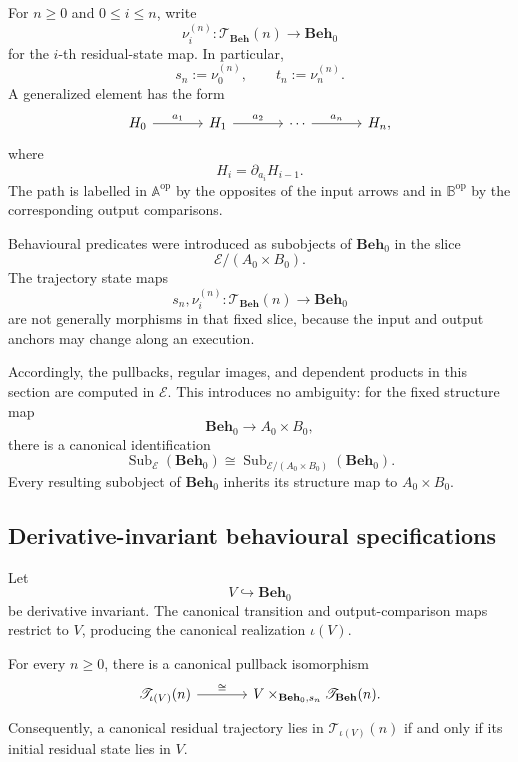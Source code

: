For \(n\geq0\) and \(0\leq i\leq n\), write
\[
    \nu_i^{(n)}:
    \mathscr T_{\mathbf{Beh}}(n)
    \to
    \mathbf{Beh}_0
\]
for the \(i\)-th residual-state map. In particular,
\[
    s_n:=\nu_0^{(n)},
    \qquad
    t_n:=\nu_n^{(n)}.
\]
A generalized element has the form
\[
\begin{tikzcd}[column sep=large]
    H_0
        \arrow[r, "a_1"]
    &
    H_1
        \arrow[r, "a_2"]
    &
    \cdots
        \arrow[r, "a_n"]
    &
    H_n,
\end{tikzcd}
\]
where
\[
    H_i=\partial_{a_i}H_{i-1}.
\]
The path is labelled in \(\mathbb A^{\mathrm{op}}\) by the opposites of the
input arrows and in \(\mathbb B^{\mathrm{op}}\) by the corresponding output
comparisons.

\begin{remark}
\label{rem:temporal-subobject-lattices}
Behavioural predicates were introduced as subobjects of \(\mathbf{Beh}_0\) in
the slice
\[
    \mathcal E/(A_0\times B_0).
\]
The trajectory state maps
\[
    s_n,\nu_i^{(n)}:
    \mathscr T_{\mathbf{Beh}}(n)
    \to
    \mathbf{Beh}_0
\]
are not generally morphisms in that fixed slice, because the input and output
anchors may change along an execution.

Accordingly, the pullbacks, regular images, and dependent products in this
section are computed in \(\mathcal E\). This introduces no ambiguity: for
the fixed structure map
\[
    \mathbf{Beh}_0\to A_0\times B_0,
\]
there is a canonical identification
\[
    \operatorname{Sub}_{\mathcal E}(\mathbf{Beh}_0)
    \cong
    \operatorname{Sub}_{\mathcal E/(A_0\times B_0)}
    (\mathbf{Beh}_0).
\]
Every resulting subobject of \(\mathbf{Beh}_0\) inherits its structure map to
\(A_0\times B_0\).
\end{remark}

\subsection{Derivative-invariant behavioural specifications}
\label{subsec:trajectory-realization-residual-contract}

Let
\[
    V\hookrightarrow\mathbf{Beh}_0
\]
be derivative invariant. The canonical transition and output-comparison maps
restrict to \(V\), producing the canonical realization \(\iota(V)\).

\begin{theorem}
\label{thm:trajectory-object-residual-contract}
For every \(n\geq0\), there is a canonical pullback isomorphism
\[
\begin{tikzcd}[column sep=large]
    \mathscr T_{\iota(V)}(n)
        \arrow[r, "\cong"]
    &
    V\times_{\mathbf{Beh}_0,s_n}
    \mathscr T_{\mathbf{Beh}}(n).
\end{tikzcd}
\]
Consequently, a canonical residual trajectory lies in
\(\mathscr T_{\iota(V)}(n)\) if and only if its initial residual state lies
in \(V\).
\end{theorem}

